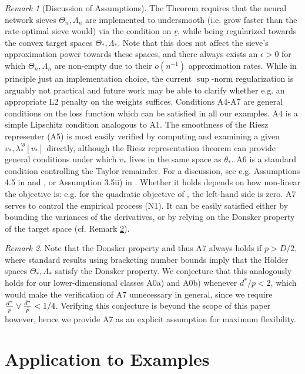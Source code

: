 \documentclass[12pt]{article}
\theoremstyle{myplain}
\theoremstyle{definition}
\theoremstyle{definition}
\theoremstyle{remark}
\newtheorem{remark}{Remark}[section]
\numberwithin{equation}{section}
\begin{document}
\begin{remark}[Discussion of Assumptions]
The Theorem requires that the neural network sieves $\Theta_n,\Lambda_n$ are implemented to undersmooth (i.e. grow faster than the rate-optimal sieve would) via the condition on $\underline{r}$, while being regularized towards the convex target spaces $\Theta_*, \Lambda_*$. Note that this does not affect the sieve's approximation power towards these spaces, and there always exists an $\epsilon>0$ for which $\Theta_n,\Lambda_n$ are non-empty due to their $o(n^{-1})$ approximation rates. While in principle just an implementation choice, the current $\sup$-norm regularization is arguably not practical and future work may be able to clarify whether e.g. an appropriate L2 penalty on the weights suffices. Conditions A4-A7 are general conditions on the loss function which can be satisfied in all our examples. A4 is a simple Lipschitz condition analogous to A1. The smoothness of the Riesz representer (A5) is most easily verified by computing and examining a given $v_*, \lambda_*^{\prime\theta}[v_*]$ directly, although the Riesz representation theorem can provide general conditions under which $v_*$ lives in the same space as $\theta_*$. A6 is a standard condition controlling the Taylor remainder. For a discussion, see e.g. Assumptions 4.5 in \cite{aichen2003} and \cite{aichen2007}, or Assumption 3.5ii) in \cite{sievewald2015}. Whether it holds depends on how non-linear the objective is: e.g. for the quadratic objective of \cite{dikkala2020minimax}, the left-hand side is zero. A7 serves to control the empirical process (N1). It can be easily satisfied either by bounding the variances of the derivatives, or by relying on the Donsker property of the target space (cf. Remark \ref{rem:donsker}).
\end{remark}
\begin{remark}\label{rem:donsker}
Note that the Donsker property and thus A7 always holds if $p>D/2$, where standard results using bracketing number bounds imply that the Hölder spaces $\Theta_*, \Lambda_*$ satisfy the Donsker property. We conjecture that this analogously holds for our lower-dimensional classes A0a) and A0b) whenever $d^*/p<2$, which would make the verification of A7 unnecessary in general, since we require $\frac{d^*}{p}\vee\frac{\Bar{d}^*}{\Bar{p}}<1/4$. Verifying this conjecture is beyond the scope of this paper however, hence we provide A7 as an explicit assumption for maximum flexibility.
\end{remark}

\section{Application to Examples}
\label{sec:application}
\end{document}
